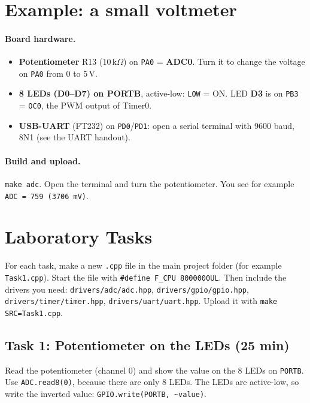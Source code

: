 \documentclass[11pt,a4paper]{article}
\newcommand{\code}[1]{\texttt{#1}}
\begin{document}
\newpage
\section{Example: a small voltmeter}

\paragraph{Board hardware.}
\begin{itemize}
  \item \textbf{Potentiometer} R13 (10\,k$\Omega$) on \code{PA0} = \textbf{ADC0}.
        Turn it to change the voltage on \code{PA0} from 0 to 5\,V.
  \item \textbf{8 LEDs (D0--D7) on PORTB}, active-low: \code{LOW} = ON. LED \textbf{D3} is
        on \code{PB3} = \code{OC0}, the PWM output of Timer0.
  \item \textbf{USB-UART} (FT232) on \code{PD0}/\code{PD1}: open a serial terminal with
        9600 baud, 8N1 (see the UART handout).
\end{itemize}

\paragraph{Build and upload.} \code{make adc}. Open the terminal and turn the
potentiometer. You see for example \code{ADC = 759   (3706 mV)}.



\newpage
\section{Laboratory Tasks}
\setlength{\parindent}{0pt}\setlength{\parskip}{5pt}\raggedright

For each task, make a new \code{.cpp} file in the main project folder (for
example \code{Task1.cpp}). Start the file with \code{\#define F\_CPU 8000000UL}.
Then include the drivers you need: \code{drivers/adc/adc.hpp},
\code{drivers/gpio/gpio.hpp}, \code{drivers/timer/timer.hpp},
\code{drivers/uart/uart.hpp}. Upload it with \code{make SRC=Task1.cpp}.

\subsection*{Task 1: Potentiometer on the LEDs (25 min)}
Read the potentiometer (channel 0) and show the value on the 8 LEDs on
\code{PORTB}. Use \code{ADC.read8(0)}, because there are only 8 LEDs. The LEDs
are active-low, so write the inverted value:
\mbox{\code{GPIO.write(PORTB, \textasciitilde value)}}.
\end{document}
